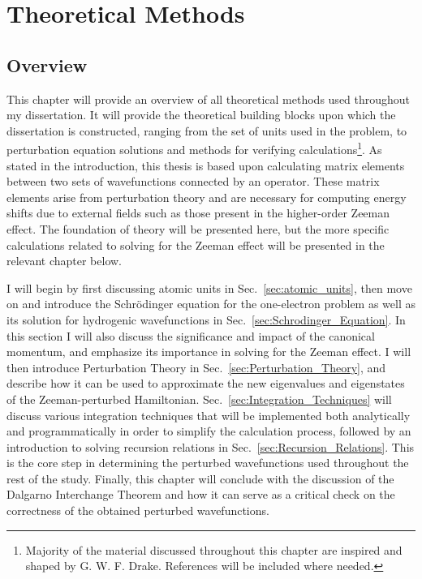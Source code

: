 \chapter{Theoretical Methods} \label{Theoretical_Methods}
    \section{Overview}
        This chapter will provide an overview of all theoretical methods used throughout my dissertation. It will provide the theoretical building blocks upon which the dissertation is constructed, ranging from the set of units used in the problem, to perturbation equation solutions and methods for verifying calculations\footnote{Majority of the material discussed throughout this chapter are inspired and shaped by G. W. F. Drake. References will be included where needed.}. As stated in the introduction, this thesis is based upon calculating matrix elements between two sets of wavefunctions connected by an operator. These matrix elements arise from perturbation theory and are necessary for computing energy shifts due to external fields such as those present in the higher-order Zeeman effect. The foundation of theory will be presented here, but the more specific calculations related to solving for the Zeeman effect will be presented in the relevant chapter below.

        I will begin by first discussing atomic units in Sec.~\ref{sec:atomic_units}, then move on and introduce the Schrödinger equation for the one-electron problem as well as its solution for hydrogenic wavefunctions in Sec.~\ref{sec:Schrodinger_Equation}. In this section I will also discuss the significance and impact of the canonical momentum, and emphasize its importance in solving for the Zeeman effect. I will then introduce Perturbation Theory in Sec.~\ref{sec:Perturbation_Theory}, and describe how it can be used to approximate the new eigenvalues and eigenstates of the Zeeman-perturbed Hamiltonian. Sec.~\ref{sec:Integration_Techniques} will discuss various integration techniques that will be implemented both analytically and programmatically in order to simplify the calculation process, followed by an introduction to solving recursion relations in Sec.~\ref{sec:Recursion_Relations}. This is the core step in determining the perturbed wavefunctions used throughout the rest of the study. Finally, this chapter will conclude with the discussion of the Dalgarno Interchange Theorem and how it can serve as a critical check on the correctness of the obtained perturbed wavefunctions.
